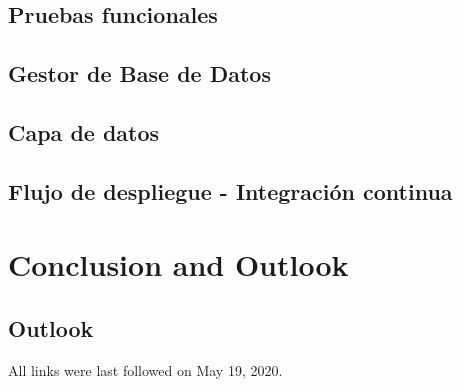\documentclass[
  a4paper,  %
  twoside,  %
  bibliography=totoc,
  headsepline,
  cleardoublepage=empty,
  parskip=half,
  draft=false
]{scrbook}
\begin{document}


\section{Pruebas funcionales}
\label{section:e2e-testing}



\section{Gestor de Base de Datos}



\section{Capa de datos}



\section{Flujo de despliegue - Integración continua}



\blinddocument

\chapter{Conclusion and Outlook}
\label{chap:zusfas}

\section*{Outlook}

\printbibliography

All links were last followed on May 19, 2020.

\appendix


\pagestyle{empty}
\renewcommand*{\chapterpagestyle}{empty}
\Versicherung
\end{document}
